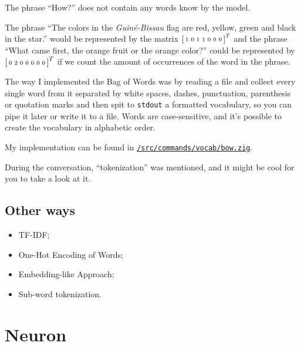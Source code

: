 \documentclass[a4paper,12pt]{article}
\theoremstyle{mytheoremstyle}
\theoremstyle{mytheoremstyle}
\theoremstyle{myproblemstyle}
\begin{document}
    The phrase ``How?'' does not contain any words know by the model.

    The phrase ``The colors in the \textit{Guiné-Bissau} flag are red, yellow,
    green and black in the star.'' would be represented by the matrix
    $\begin{bsmallmatrix}1&0&1&1&0&0&0\end{bsmallmatrix}^T$ and the phrase
    ``What came first, the orange fruit or the orange color?'' could be
    represented by $\begin{bsmallmatrix}0&2&0&0&0&0&0\end{bsmallmatrix}^T$ if
    we count the amount of occurrences of the word in the phrase.

    The way I implemented the Bag of Words was by reading a file and collect
    every single word from it separated by white spaces, dashes, punctuation,
    parenthesis or quotation marks and then spit to \texttt{stdout} a formatted
    vocabulary, so you can pipe it later or write it to a file. Words are
    case-sensitive, and it's possible to create the vocabulary in alphabetic
    order.

    My implementation can be found in
    \href{run:../src/commands/vocab/bow.zig}{\texttt{/src/commands/vocab/bow.zig}}.

    During the conversation, ``tokenization'' was mentioned, and it might be
    cool for you to take a look at it.

    \subsection{Other ways}

    \begin{itemize}
        \item TF-IDF;
        \item One-Hot Encoding of Words;
        \item Embedding-like Approach;
        \item Sub-word tokenization.
    \end{itemize}

    \section{Neuron}
\end{document}
